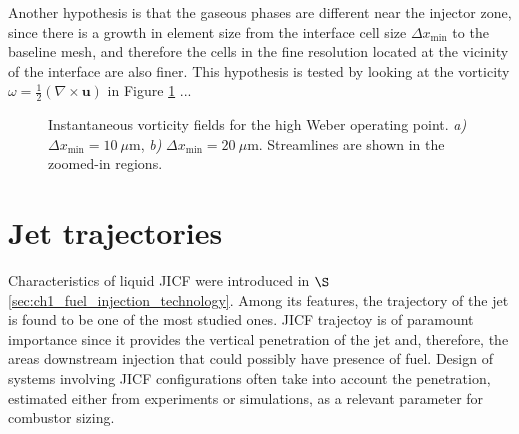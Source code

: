 Another hypothesis is that the gaseous phases are different near the injector zone, since there is a growth in element size from the interface cell size $\Delta x_\mathrm{min}$ to the baseline mesh, and therefore the cells in the fine resolution located at the vicinity of the interface are also finer. This hypothesis is tested by looking at the vorticity $\omega = \frac{1}{2} \left( \nabla \times \textbf{u} \right)$ in Figure \ref{fig:JICF_instabilities_vorticity} ... \\

\begin{figure}[ht]
\flushleft
{}
\caption[Instantaneous vorticity fields for the high Weber operating point.]{Instantaneous vorticity fields for the high Weber operating point. \textsl{a)} $\Delta x_\mathrm{min} = 10~\mu$m, \textsl{b)} $\Delta x_\mathrm{min} = 20~\mu$m. Streamlines are shown in the zoomed-in regions.}
\label{fig:JICF_instabilities_vorticity}
\end{figure}








\section{Jet trajectories}
\label{subsec:ch5_jet_trajectories_results}

Characteristics of liquid JICF were introduced in $\S$\ref{sec:ch1_fuel_injection_technology}. Among its features, the trajectory of the jet is found to be one of the most studied ones. JICF trajectoy is of paramount importance since it provides the vertical penetration of the jet and, therefore, the areas downstream injection that could possibly have presence of fuel. Design of systems involving JICF configurations often take into account the penetration, estimated either from experiments or simulations, as a relevant parameter for combustor sizing.

